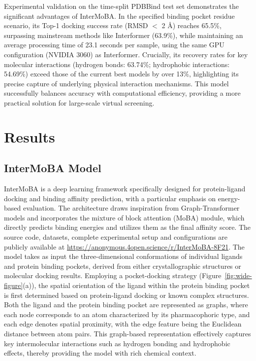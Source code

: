 \documentclass[lettersize,journal]{IEEEtran}
\begin{document}
Experimental validation on the time-split PDBBind\cite{corso2022diffdock} test set demonstrates the significant advantages of InterMoBA. In the specified binding pocket residue scenario\cite{jain2024deep}, its Top-1 docking success rate (RMSD $<$ 2 \AA) reaches 65.5\%, surpassing mainstream methods like Interformer (63.9\%)\cite{lai2024interformer}, while maintaining an average processing time of 23.1 seconds per sample, using the same GPU configuration (NVIDIA 3060) as Interformer. Crucially, its recovery rates for key molecular interactions (hydrogen bonds: 63.74\%; hydrophobic interactions: 54.69\%) exceed those of the current best models by over 13\%, highlighting its precise capture of underlying physical interaction mechanisms. This model successfully balances accuracy with computational efficiency, providing a more practical solution for large-scale virtual screening. 

\section{Results}

\subsection{InterMoBA Model}

InterMoBA is a deep learning framework specifically designed for protein-ligand docking and binding affinity prediction, with a particular emphasis on energy-based evaluation. The architecture draws inspiration from Graph-Transformer\cite{vaswani2017attention} \cite{yun2019graph} models and incorporates the mixture of block attention (MoBA)\cite{bishop1994mixture} module, which directly predicts binding energies and utilizes them as the final affinity score. The source code, datasets, complete experimental setup and configurations are publicly available at \href{https://anonymous.4open.science/r/InterMoBA-8F21}{https://anonymous.4open.science/r/InterMoBA-8F21}.
The model takes as input the three-dimensional conformations of individual ligands and protein binding pockets, derived from either crystallographic structures or molecular docking results. Employing a pocket-docking strategy (Figure~\ref{fig:wide-figure}(a)), the spatial orientation of the ligand within the protein binding pocket is first determined based on protein-ligand docking or known complex structures. Both the ligand and the protein binding pocket are represented as graphs\cite{stark2022equibind}, where each node corresponds to an atom characterized by its pharmacophoric type, and each edge denotes spatial proximity, with the edge feature being the Euclidean distance between atom pairs. This graph-based\cite{scarselli2008graph} representation effectively captures key intermolecular interactions such as hydrogen bonding and hydrophobic effects, thereby providing the model with rich chemical context.
\end{document}
